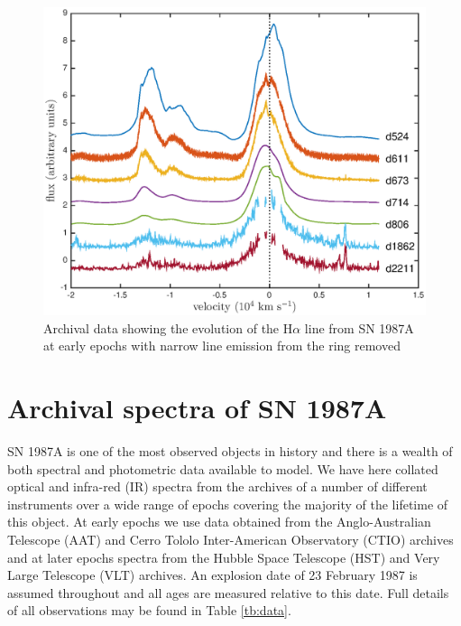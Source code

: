 \documentclass[useAMS,usenatbib,usegraphicx]{mnras}
\begin{document}
\begin{figure}
\includegraphics[trim =39 10 45 15,clip=true,scale=0.51]{Ha_evol_early_1col}
\caption{Archival data showing the evolution of the H$\alpha$ line from SN 1987A at early epochs with narrow line emission from the ring removed}
\label{Ha_evol_early}
\end{figure}


\section{Archival spectra of SN 1987A}
\label{spectra}
SN 1987A is one of the most observed objects in history and there is a wealth of both spectral and photometric data available to model.  We have here collated optical and infra-red (IR) spectra from the archives of a number of different instruments over a wide range of epochs covering the majority of the lifetime of this object.  At early epochs we use data obtained from the Anglo-Australian Telescope (AAT) and Cerro Tololo Inter-American Observatory (CTIO) archives and at later epochs spectra from the Hubble Space Telescope (HST) and Very Large Telescope (VLT) archives.  An explosion date of 23 February 1987 is assumed throughout and all ages are measured relative to this date.  Full details of all observations may be found in Table \ref{tb:data}.
\end{document}
